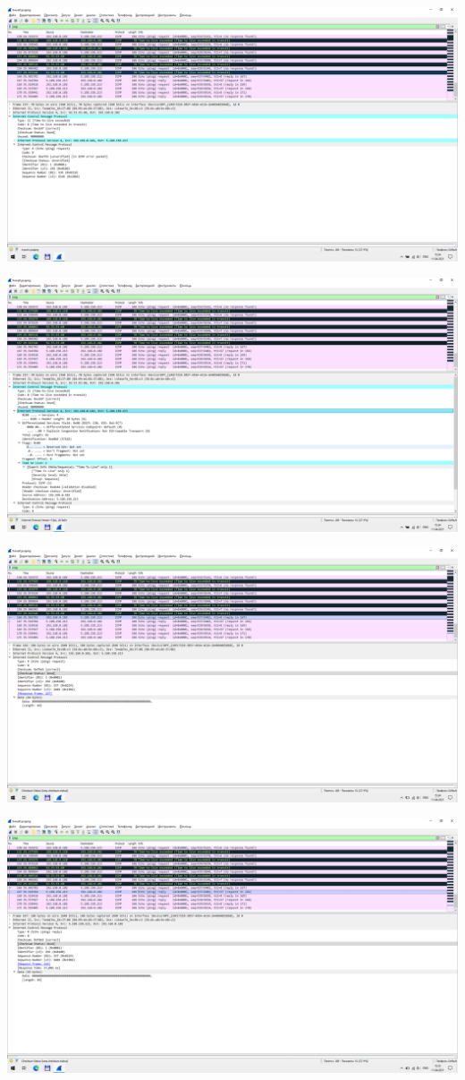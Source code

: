 \begin{center}
    \includegraphics[width=\textwidth]{screenshots/tracert_ttl_response_1}

    \includegraphics[width=\textwidth]{screenshots/tracert_ttl_response_2}

    \includegraphics[width=\textwidth]{screenshots/tracert_success_request_1}

    \includegraphics[width=\textwidth]{screenshots/tracert_success_response_1}


\end{center}
